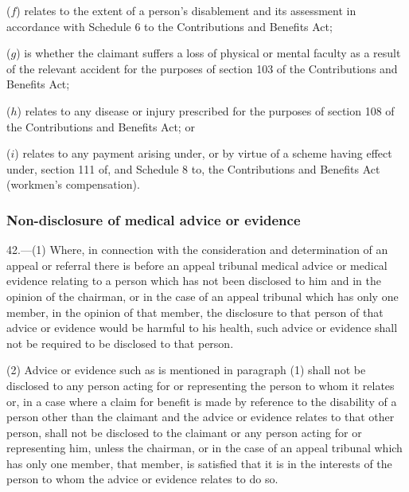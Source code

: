 \documentclass[12pt,a4paper]{article}
\begin{document}
\begin{enumerate}

($f$) relates to the extent of a person’s disablement and its assessment in accordance with Schedule 6 to the Contributions and Benefits Act;

($g$) is whether the claimant suffers a loss of physical or mental faculty as a result of the relevant accident for the purposes of section 103 of the Contributions and Benefits Act;

($h$) relates to any disease or injury prescribed for the purposes of section 108 of the Contributions and Benefits Act; or

($i$) relates to any payment arising under, or by virtue of a scheme having effect under, section 111 of, and Schedule 8 to, the Contributions and Benefits Act (workmen’s compensation).
\end{enumerate}


\subsubsection[42. Non-disclosure of medical advice or evidence]{Non-disclosure of medical advice or evidence}

42.—(1) Where, in connection with the consideration and determination of an appeal or referral there is before an appeal tribunal medical advice or medical evidence relating to a person which has not been disclosed to him and in the opinion of the chairman, or in the case of an appeal tribunal which has only one member, in the opinion of that member, the disclosure to that person of that advice or evidence would be harmful to his health, such advice or evidence shall not be required to be disclosed to that person.

(2) Advice or evidence such as is mentioned in paragraph (1) shall not be disclosed to any person acting for or representing the person to whom it relates or, in a case where a claim for benefit is made by reference to the disability of a person other than the claimant and the advice or evidence relates to that other person, shall not be disclosed to the claimant or any person acting for or representing him, unless the chairman, or in the case of an appeal tribunal which has only one member, that member, is satisfied that it is in the interests of the person to whom the advice or evidence relates to do so.
\end{document}
